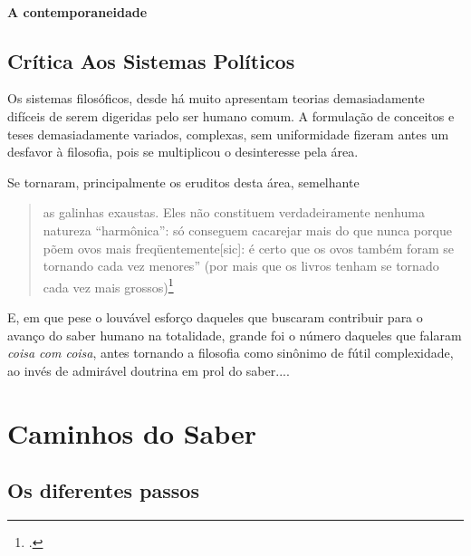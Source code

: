 \lipsum[1-5]


\subsection{A contemporaneidade}



\lipsum[1-5]


\chapter{Crítica Aos Sistemas Políticos}

Os sistemas filosóficos, desde há muito apresentam teorias demasiadamente difíceis de serem digeridas pelo ser humano comum. A formulação de conceitos e teses demasiadamente variados, complexas, sem uniformidade fizeram antes um desfavor à filosofia, pois se multiplicou o desinteresse pela área.

Se tornaram, principalmente os eruditos desta área, semelhante

\begin{quote}
	as galinhas exaustas. Eles não constituem verdadeiramente nenhuma natureza “harmônica”: só conseguem cacarejar mais do que nunca porque põem ovos mais freqüentemente[sic]: é certo que os ovos também foram se tornando cada vez menores'' (por mais que os livros tenham se tornado cada vez mais grossos)\footcite[p. 64]{Nietzsche2003Segunda}
\end{quote}

E, em que pese o louvável esforço daqueles que buscaram contribuir para o avanço do saber humano na totalidade, grande foi o número daqueles que falaram \textit{coisa com coisa}, antes tornando a filosofia como sinônimo de fútil complexidade, ao invés de admirável doutrina em prol do saber....








\part{Caminhos do Saber}

\chapter{Os diferentes passos }


